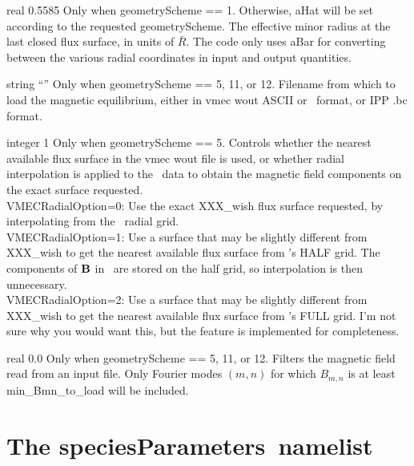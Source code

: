 \myhrule

{real}
{0.5585}
{Only when {\ttfamily geometryScheme} == 1. Otherwise, {\ttfamily aHat} will be set according to the requested {\ttfamily geometryScheme}.}
{The effective minor radius at the last closed flux surface, in units of $\bar{R}$.
The code only uses {\ttfamily aBar} for converting between the various radial coordinates in input and output quantities.
}

\myhrule

{string}
{``''}
{Only when {\ttfamily geometryScheme} == 5, 11, or 12.}
{Filename from which to load the magnetic equilibrium, either in {\ttfamily vmec wout} ASCII or \netCDF~format, or IPP {\ttfamily .bc} format.}

\myhrule

{integer}
{1}
{Only when {\ttfamily geometryScheme} == 5.}
{Controls whether the nearest available flux surface in the {\ttfamily vmec wout} file is used, or whether radial interpolation is applied to the \vmec~data
to obtain the magnetic field components on the exact surface requested.\\

{\ttfamily VMECRadialOption}=0: Use the exact {\ttfamily XXX\_wish} flux surface requested, by interpolating from the \vmec~radial grid.\\

{\ttfamily VMECRadialOption}=1: Use a surface that may be slightly different from {\ttfamily XXX\_wish} to get the nearest available flux surface from \vmec's HALF grid.  
   The components of ${\mathbf B}$ in \vmec~are stored on the half grid, so interpolation is then unnecessary.\\

{\ttfamily VMECRadialOption}=2: Use a surface that may be slightly different from {\ttfamily XXX\_wish} to get the nearest available flux surface from \vmec's FULL grid.
I'm not sure why you would want this, but the feature is implemented for completeness.
}

\myhrule

{real}
{0.0}
{Only when {\ttfamily geometryScheme} == 5, 11, or 12.}
{Filters the magnetic field read from an input file.  Only Fourier modes $(m,n)$ for which $B_{m,n}$ is at least {\ttfamily min\_Bmn\_to\_load} will be included.}




\section{The {\ttfamily speciesParameters}~namelist}

